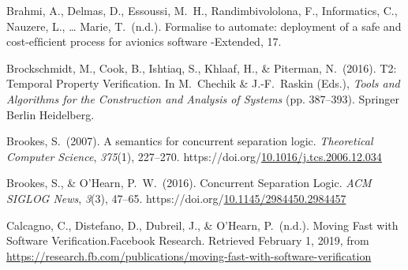 \documentclass[12pt,twoside]{article}
\begin{document}
{\begin{thebibliography}{222}
\mdbibitemlabel{[Brahmi et al., n.d.]}Brahmi, A., Delmas, D., Essoussi, M.~H., Randimbivololona, F., Informatics, C., Nauzere, L., … Marie, T.~(n.d.). Formalise to automate: deployment of a safe and cost-efﬁcient process for avionics software -Extended, 17.\label{brahmi_formalise_nodate}%

Brockschmidt, M., Cook, B., Ishtiaq, S., Khlaaf, H., \& Piterman, N.~(2016). T2: Temporal Property Verification. In M.~Chechik \& J.-F.~Raskin (Eds.), \emph{Tools and Algorithms for the Construction and Analysis of Systems} (pp. 387–393). Springer Berlin Heidelberg.\label{brockschmidt_t2:_2016}%

\mdbibitemlabel{[Brookes, 2007]}Brookes, S.~(2007). A semantics for concurrent separation logic. \emph{Theoretical Computer Science}, \emph{375}(1), 227–270. https://doi.org/\href{https://dx.doi.org/10.1016/j.tcs.2006.12.034}{10.1016/j.tcs.2006.12.034}\label{brookes_semantics_2007}%

Brookes, S., \& O’Hearn, P.~W.~(2016). Concurrent Separation Logic. \emph{ACM SIGLOG News}, \emph{3}(3), 47–65. https://doi.org/\href{https://dx.doi.org/10.1145/2984450.2984457}{10.1145/2984450.2984457}\label{brookes_concurrent_2016}%

Calcagno, C., Distefano, D., Dubreil, J., \& O’Hearn, P.~(n.d.). Moving Fast with Software Verification.Facebook Research. Retrieved February 1, 2019, from \href{https://research.fb.com/publications/moving-fast-with-software-verification}{{\ttfamily https://\hspace{0pt}research.\hspace{0pt}fb.\hspace{0pt}com/\hspace{0pt}publications/\hspace{0pt}moving-\hspace{0pt}fast-\hspace{0pt}with-\hspace{0pt}software-\hspace{0pt}verification}}\label{calcagno_moving_nodate}%


\end{thebibliography}}
\end{document}

